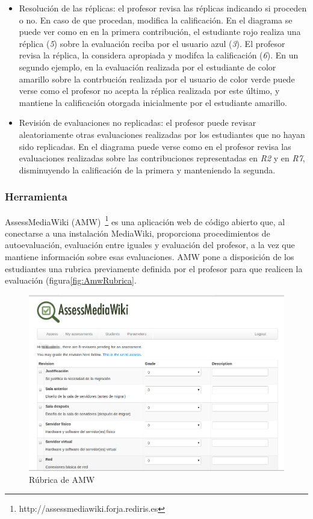 \begin{itemize}
\item Resolución de las réplicas: el profesor revisa las réplicas indicando si proceden o no. En caso de que procedan, modifica la calificación. En el diagrama se puede ver como en en la primera contribución, el estudiante rojo realiza una réplica (\emph{5}) sobre la evaluación reciba por el usuario azul (\emph{3}). El profesor revisa la réplica, la considera apropiada y modifca la calificación (\emph{6}). En un segundo ejemplo, en la evaluación realizada por el estudiante de color amarillo sobre la contrbución realizada por el usuario de color verde puede verse como el profesor no acepta la réplica realizada por este último, y mantiene la calificación otorgada inicialmente por el estudiante amarillo.
\item Revisión de evaluaciones no replicadas: el profesor puede revisar aleatoriamente otras evaluaciones realizadas por los estudiantes que no hayan sido replicadas. En el diagrama puede verse como en el profesor revisa las evaluaciones realizadas sobre las contribuciones representadas en \emph{R2} y en \emph{R7}, disminuyendo la calificación de la primera y manteniendo la segunda.
\end{itemize}

\subsubsection{Herramienta}

AssessMediaWiki (AMW)~\footnote{http://assessmediawiki.forja.rediris.es} es una aplicación web de código abierto que, al conectarse a una instalación MediaWiki, proporciona procedimientos de autoevaluación, evaluación entre iguales y evaluación del profesor, a la vez que mantiene información sobre esas evaluaciones. AMW pone a disposición de los estudiantes una rubrica previamente definida por el profesor para que realicen la evaluación (figura\ref{fig:AmwRubrica}. 

\begin{figure}
  \begin{center}
    \includegraphics[scale=0.3]{AmwRubrica.png}
  \end{center}
  \caption{Rúbrica de AMW}
  \label{fig:AmwFormative}
\end{figure}

